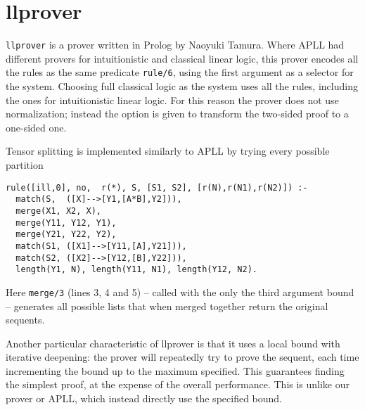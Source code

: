 \section{llprover}
\texttt{llprover} is a prover written in Prolog by Naoyuki Tamura.
Where APLL had different provers for intuitionistic and classical linear logic, this prover encodes all the rules as the same predicate \texttt{rule/6}, using the first argument as a selector for the system.
Choosing full classical logic as the system uses all the rules, including the ones for intuitionistic linear logic.
For this reason the prover does not use normalization; instead the option is given to transform the two-sided proof to a one-sided one.

Tensor splitting is implemented similarly to APLL by trying every possible partition
\begin{verbatim}
rule([ill,0], no,  r(*), S, [S1, S2], [r(N),r(N1),r(N2)]) :-
  match(S,  ([X]-->[Y1,[A*B],Y2])),
  merge(X1, X2, X),
  merge(Y11, Y12, Y1),
  merge(Y21, Y22, Y2),
  match(S1, ([X1]-->[Y11,[A],Y21])),
  match(S2, ([X2]-->[Y12,[B],Y22])),
  length(Y1, N), length(Y11, N1), length(Y12, N2).
\end{verbatim}
Here \texttt{merge/3} (lines 3, 4 and 5) -- called with the only the third argument bound -- generates all possible lists that when merged together return the original sequents.

Another particular characteristic of llprover is that it uses a local bound with iterative deepening: the prover will repeatedly try to prove the sequent, each time incrementing the bound up to the maximum specified.
This guarantees finding the simplest proof, at the expense of the overall performance.
This is unlike our prover or APLL, which instead directly use the specified bound.

